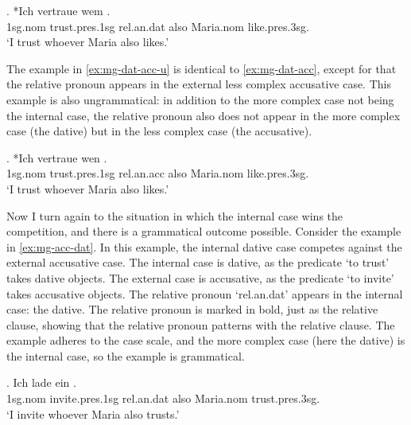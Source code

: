 \exg. *Ich vertraue wem   . \\
1\ac{sg}.\ac{nom} trust.\ac{pres}.1\ac{sg}\scsub{[dat]} \ac{rel}.\ac{an}.\ac{dat} also Maria.\ac{nom} like.\ac{pres}.3\ac{sg}\scsub{[acc]}.\\
`I trust whoever Maria also likes.' \label{ex:mg-dat-acc}

The example in \ref{ex:mg-dat-acc-u} is identical to \ref{ex:mg-dat-acc}, except for that the relative pronoun appears in the external less complex accusative case. This example is also ungrammatical: in addition to the more complex case not being the internal case, the relative pronoun also does not appear in the more complex case (the dative) but in the less complex case (the accusative).

\exg. *Ich vertraue wen   . \\
1\ac{sg}.\ac{nom} trust.\ac{pres}.1\ac{sg}\scsub{[dat]} \ac{rel}.\ac{an}.\ac{acc} also Maria.\ac{nom} like.\ac{pres}.3\ac{sg}\scsub{[acc]}.\\
`I trust whoever Maria also likes.' \label{ex:mg-dat-acc-u}

Now I turn again to the situation in which the internal case wins the competition, and there is a grammatical outcome possible.
Consider the example in \ref{ex:mg-acc-dat}. In this example, the internal dative case competes against the external accusative case.
The internal case is dative, as the predicate  `to trust' takes dative objects.
The external case is accusative, as the predicate  `to invite' takes accusative objects.
The relative pronoun  `\ac{rel}.\ac{an}.\ac{dat}' appears in the internal case: the dative. The relative pronoun is marked in bold, just as the relative clause, showing that the relative pronoun patterns with the relative clause.
The example adheres to the case scale, and the more complex case (here the dative) is the internal case, so the example is grammatical.

\exg. Ich {lade ein}    . \\
1\ac{sg}.\ac{nom} invite.\ac{pres}.1\ac{sg}\scsub{[acc]} \ac{rel}.\ac{an}.\ac{dat} also Maria.\ac{nom} trust.\ac{pres}.3\ac{sg}\scsub{[dat]}.\\
`I invite whoever Maria also trusts.' \label{ex:mg-acc-dat}

